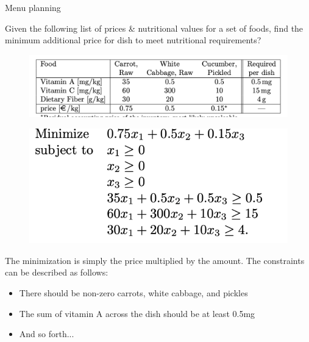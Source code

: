 \documentclass[../notes.tex]{subfiles}
\begin{document}
\begin{example}
    Menu planning

    Given the following list of prices \& nutritional values for a set of foods, find the minimum additional price for dish to meet nutritional requirements?
    \begin{figure}[H]
        \centering
        \includegraphics[width=0.8\linewidth]{img/image_2023-03-08-16-37-59.png}
    \end{figure}


    \begin{figure}[H]
        \centering
        \includegraphics[width=0.8\linewidth]{img/image_2023-03-08-16-38-07.png}
    \end{figure}

    The minimization is simply the price multiplied by the amount. The constraints can be described as follows:

    \begin{itemize}
        \item There should be non-zero carrots, white cabbage, and pickles
        \item The sum of vitamin A across the dish should be at least 0.5mg
        \item And so forth...
    \end{itemize}

\end{example}
\end{document}
